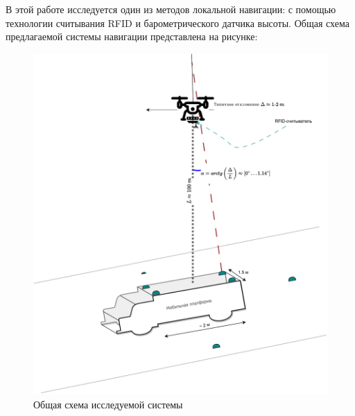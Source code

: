 В этой работе исследуется один из методов локальной навигации: 
с помощью технологии считывания RFID и барометрического датчика высоты. 
Общая схема предлагаемой системы навигации представлена на рисунке: %
\begin{figure}[ht]
    \begin{center}
        \includegraphics[width=0.85\linewidth]{Dissertation/images/rfid_navigation_general_schema.pdf}
        \caption{Общая схема исследуемой системы}\label{fig:intro_gen_schema}
    \end{center}
\end{figure}


